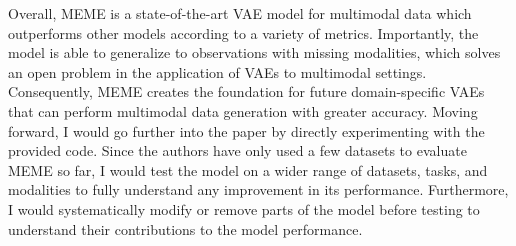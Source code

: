 \documentclass{article}
\begin{document}
Overall, MEME is a state-of-the-art VAE model for multimodal data which outperforms other models according to a variety of metrics. Importantly, the model is able to generalize to observations with missing modalities, which solves an open problem in the application of VAEs to multimodal settings. Consequently, MEME creates the foundation for future domain-specific VAEs that can perform multimodal data generation with greater accuracy. Moving forward, I would go further into the paper by directly experimenting with the provided code. Since the authors have only used a few datasets to evaluate MEME so far, I would test the model on a wider range of datasets, tasks, and modalities to fully understand any improvement in its performance. Furthermore, I would systematically modify or remove parts of the model before testing to understand their contributions to the model performance.
\end{document}
